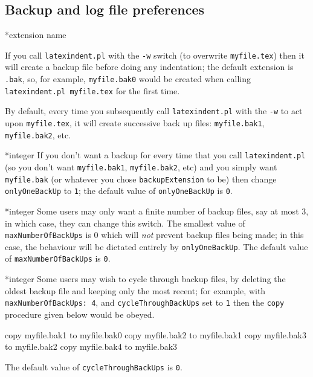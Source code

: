 
\subsection{Backup and log file preferences}
*{extension name}

	If you call \texttt{latexindent.pl} with the \texttt{-w} switch (to overwrite
	\texttt{myfile.tex}) then it will create a backup file before doing any indentation; the
	default extension is \texttt{.bak}, so, for example, \texttt{myfile.bak0} would be
	created when calling \texttt{latexindent.pl myfile.tex} for the first time.

	By default, every time you subsequently call \texttt{latexindent.pl} with the \texttt{-w}
	to act upon \texttt{myfile.tex}, it will create successive back up files:
	\texttt{myfile.bak1}, \texttt{myfile.bak2}, etc.

*{integer}
	\label{page:onlyonebackup}
	If you don't want a backup for every time that you call \texttt{latexindent.pl} (so you
	don't want \texttt{myfile.bak1}, \texttt{myfile.bak2}, etc) and you simply want
	\texttt{myfile.bak} (or whatever you chose \texttt{backupExtension} to be) then change
	\texttt{onlyOneBackUp} to \texttt{1}; the default value of \texttt{onlyOneBackUp} is
	\texttt{0}.

*{integer}
	Some users may only want a finite number of backup files, say at most $3$, in which case,
	they can change this switch. The smallest value of \texttt{maxNumberOfBackUps} is $0$
	which will \emph{not} prevent backup files being made; in this case, the behaviour will
	be dictated entirely by \texttt{onlyOneBackUp}. The default value of
	\texttt{maxNumberOfBackUps} is \texttt{0}.

*{integer}
	Some users may wish to cycle through backup files, by deleting the oldest backup file and
	keeping only the most recent; for example, with \texttt{maxNumberOfBackUps: 4}, and
	\texttt{cycleThroughBackUps} set to \texttt{1} then the \texttt{copy} procedure given
	below would be obeyed.

	\begin{commandshell}
copy myfile.bak1 to myfile.bak0
copy myfile.bak2 to myfile.bak1
copy myfile.bak3 to myfile.bak2
copy myfile.bak4 to myfile.bak3
\end{commandshell}
	The default value of \texttt{cycleThroughBackUps} is \texttt{0}.

